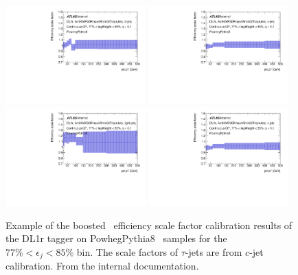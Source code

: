 \begin{figure}
    \centering
    \includegraphics[width=0.48\textwidth]{Images/VH/Obj/FTAGCalib/ftagboo/DL1r_AntiKtVR30Rmax4Rmin02TrackJets_BTagging201903_Continuous_B_410470_77_85_eta01.pdf}
    \includegraphics[width=0.48\textwidth]{Images/VH/Obj/FTAGCalib/ftagboo/DL1r_AntiKtVR30Rmax4Rmin02TrackJets_BTagging201903_Continuous_C_410470_77_85_eta01.pdf}
    \includegraphics[width=0.48\textwidth]{Images/VH/Obj/FTAGCalib/ftagboo/DL1r_AntiKtVR30Rmax4Rmin02TrackJets_BTagging201903_Continuous_Light_410470_77_85_eta01.pdf}
    \includegraphics[width=0.48\textwidth]{Images/VH/Obj/FTAGCalib/ftagboo/DL1r_AntiKtVR30Rmax4Rmin02TrackJets_BTagging201903_Continuous_T_410470_77_85_eta01.pdf}
    \caption{ Example of the boosted \vhb\ efficiency scale factor calibration results of the DL1r tagger on PowhegPythia8 \ttb\ samples for the $77\%<\epsilon_j<85\%$ bin. The scale factors of $\tau$-jets are from $c$-jet calibration. From the internal documentation.}
    \label{appfig:FTAG_calibration_boosted}
\end{figure}


